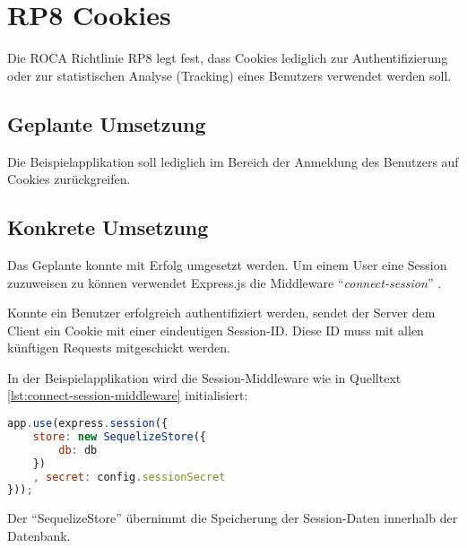 \section{RP8 Cookies}
\label{sec:principle-rp8-cookies}
Die ROCA Richtlinie RP8 legt fest, dass Cookies lediglich zur Authentifizierung oder zur statistischen Analyse (Tracking) eines Benutzers verwendet werden soll.

\subsection*{Geplante Umsetzung}
Die Beispielapplikation soll lediglich im Bereich der Anmeldung des Benutzers auf Cookies zurückgreifen.

\subsection*{Konkrete Umsetzung}
Das Geplante konnte mit Erfolg umgesetzt werden.
Um einem User eine Session zuzuweisen zu können verwendet Express.js \cite{Expressjs} die \gls{Middleware} ``\emph{connect-session}'' \cite{ConnectSession}.

Konnte ein Benutzer erfolgreich authentifiziert werden, sendet der Server dem Client ein Cookie mit einer eindeutigen Session-ID. Diese ID muss mit allen künftigen Requests mitgeschickt werden.

In der Beispielapplikation wird die Session-Middleware wie in Quelltext \ref{lst:connect-session-middleware} initialisiert:

\begin{lstlisting}[language=JavaScript, caption=Connect Session Middleware \cite{RoomiesMiddlewareHttp}, label=lst:connect-session-middleware, firstnumber=31]
app.use(express.session({
	store: new SequelizeStore({
		db: db
	})
	, secret: config.sessionSecret
}));
\end{lstlisting}

Der ``SequelizeStore'' \cite{SequelizeStore} übernimmt die Speicherung der Session-Daten innerhalb der Datenbank.

